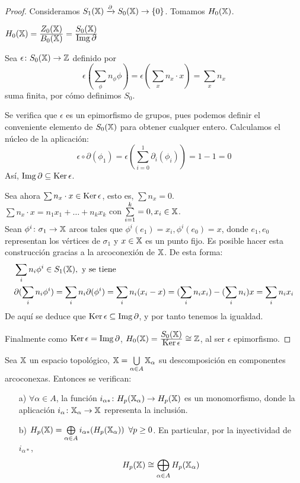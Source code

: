 \begin{proof}
  Consideramos $S_{1}({\mathbb X}) \xrightarrow{\partial} S_{0}({\mathbb X}) \to \{0\}$. Tomamos $H_0({\mathbb X})$.

  $H_0({\mathbb X}) = \frac{\displaystyle Z_0({\mathbb X})}{\displaystyle B_0({\mathbb X})} = \frac{\displaystyle S_0({\mathbb X})}{\displaystyle \operatorname{Img} \partial}$

  Sea $\epsilon \colon S_0({\mathbb X}) \to \mathbb{Z}$ definido por \[\epsilon(\sum\limits_{\phi} n_\phi \phi) = \epsilon(\sum\limits_{x} n_x \cdot x) = \sum\limits_{x} n_x \]
  suma finita, por cómo definimos $S_0$.

  Se verifica que $\epsilon$ es un epimorfismo de grupos, pues podemos definir el conveniente elemento de $S_0({\mathbb X})$ para obtener
  cualquer entero. Calculamos el núcleo de la aplicación:
  \[ \epsilon \circ \partial(\phi_1) = \epsilon(\sum_{i=0}^1 \partial_i(\phi_i)) = 1 - 1 = 0\]  Así, $\operatorname{Img} \partial \subseteq \operatorname{Ker} \epsilon$.

  Sea ahora $\sum n_x \cdot x \in \operatorname{Ker} \epsilon$, esto es, $\sum n_x = 0$. \\
  $\sum n_x \cdot x = n_1 x_1 + \dots + n_k x_k$ con $\sum\limits_{i=1}^k = 0, x_i \in {\mathbb X}$. \\
  Sean $\phi^i \colon \sigma_1 \to {\mathbb X}$ arcos tales que $\phi^i(e_1) = x_i, \phi^i(e_0) = x$,
  donde $e_1, e_0$ representan los vértices de $\sigma_1$ y $x \in {\mathbb X}$ es un punto fijo.
  Es posible hacer esta construcción gracias a la arcoconexión de ${\mathbb X}$. De esta forma:
  \begin{align*}
    &\sum_i n_i \phi^i \in S_{1}({\mathbb X}), \text{ y se tiene} \\
    &\partial(\sum_i n_i \phi^i) = \sum_i n_i \partial(\phi^i) = \sum_i n_i(x_i - x) = (\sum_i n_i x_i) - (\sum_i n_i) x = \sum_i n_i x_i
  \end{align*}
  De aquí se deduce que $\operatorname{Ker} \epsilon \subseteq \operatorname{Img} \partial$, y por tanto tenemos la igualdad.

  Finalmente como $\operatorname{Ker} \epsilon = \operatorname{Img} \partial$, $H_0({\mathbb X}) = \frac{\displaystyle S_0({\mathbb X})}{\displaystyle \operatorname{Ker} \epsilon} \cong \mathbb{Z}$, al ser $\epsilon$ epimorfismo.
\end{proof}

\begin{proposition}
  Sea ${\mathbb X}$ un espacio topológico, ${\mathbb X} = \bigcup\limits_{\alpha \in A} {\mathbb X}_\alpha$ su descomposición en componentes arcoconexas. Entonces se verifican:
  \begin{itemize}
    \item[a)] $\forall \alpha \in A$, la función $i_{\alpha*} \colon H_p({\mathbb X}_\alpha) \to H_p({\mathbb X})$ es un monomorfismo, donde la aplicación
              $i_\alpha \colon {\mathbb X}_\alpha \to {\mathbb X}$ representa la inclusión.
    \item[b)] $H_p({\mathbb X}) = \bigoplus\limits_{\alpha \in A} i_{\alpha*}(H_p({\mathbb X}_\alpha)) \hspace{0.5em} \forall p \geq 0$. En particular, por la inyectividad de $i_{\alpha*}$,
              \[ H_p({\mathbb X}) \cong \bigoplus_{\alpha \in A} H_p({\mathbb X}_\alpha) \]
  \end{itemize}
\end{proposition}

